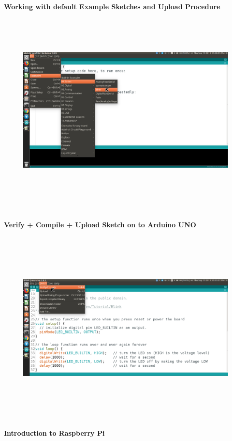 \documentclass[12pt,a4paper]{article}
\begin{document}
\textbf{Working with default Example Sketches and Upload Procedure}\\
\begin{figure}[h!]
    \centering
	\includegraphics[width=15cm, height=10cm]{Introduction/9.png}
\end{figure}
\vspace{2mm}
\\
\textbf{Verify + Compile + Upload Sketch on to Arduino UNO}
\begin{figure}[h!]
    \centering
	\includegraphics[width=15cm, height=10cm]{Introduction/10.png}
\end{figure}
\clearpage
\begin{center}
\large \textbf{Introduction to Raspberry Pi}
\end{center}
\end{document}
